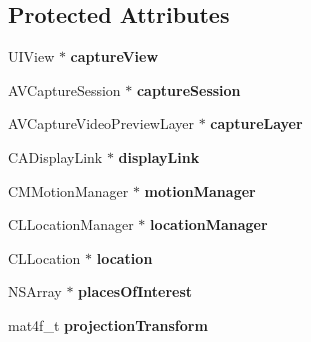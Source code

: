 \subsection*{Protected Attributes}
\begin{DoxyCompactItemize}
\item 
\hypertarget{category_a_r_view_07_08_aef98e91fb5c1370aa1896693b588c3f9}{U\-I\-View $\ast$ {\bfseries capture\-View}}\label{category_a_r_view_07_08_aef98e91fb5c1370aa1896693b588c3f9}

\item 
\hypertarget{category_a_r_view_07_08_aa9be8591e6b03f6e0d8d1e42d961ed9f}{A\-V\-Capture\-Session $\ast$ {\bfseries capture\-Session}}\label{category_a_r_view_07_08_aa9be8591e6b03f6e0d8d1e42d961ed9f}

\item 
\hypertarget{category_a_r_view_07_08_a7857b50f497bfd857b022b50d6578400}{A\-V\-Capture\-Video\-Preview\-Layer $\ast$ {\bfseries capture\-Layer}}\label{category_a_r_view_07_08_a7857b50f497bfd857b022b50d6578400}

\item 
\hypertarget{category_a_r_view_07_08_ac549affa93ee33b61e306450a90828e5}{C\-A\-Display\-Link $\ast$ {\bfseries display\-Link}}\label{category_a_r_view_07_08_ac549affa93ee33b61e306450a90828e5}

\item 
\hypertarget{category_a_r_view_07_08_a9302133df18d1dba4a051fc41288ad05}{C\-M\-Motion\-Manager $\ast$ {\bfseries motion\-Manager}}\label{category_a_r_view_07_08_a9302133df18d1dba4a051fc41288ad05}

\item 
\hypertarget{category_a_r_view_07_08_aac1a6fa3c3f1c2968ef210bf663a26bf}{C\-L\-Location\-Manager $\ast$ {\bfseries location\-Manager}}\label{category_a_r_view_07_08_aac1a6fa3c3f1c2968ef210bf663a26bf}

\item 
\hypertarget{category_a_r_view_07_08_a25b6e20509f18042b1c91b0cd025b22b}{C\-L\-Location $\ast$ {\bfseries location}}\label{category_a_r_view_07_08_a25b6e20509f18042b1c91b0cd025b22b}

\item 
\hypertarget{category_a_r_view_07_08_a4f4c7beeb7f2d27977ebe483c07fb32f}{N\-S\-Array $\ast$ {\bfseries places\-Of\-Interest}}\label{category_a_r_view_07_08_a4f4c7beeb7f2d27977ebe483c07fb32f}

\item 
\hypertarget{category_a_r_view_07_08_aa2be338c791e0e4e50f32a89e595bb42}{mat4f\-\_\-t {\bfseries projection\-Transform}}\label{category_a_r_view_07_08_aa2be338c791e0e4e50f32a89e595bb42}


\end{DoxyCompactItemize}
